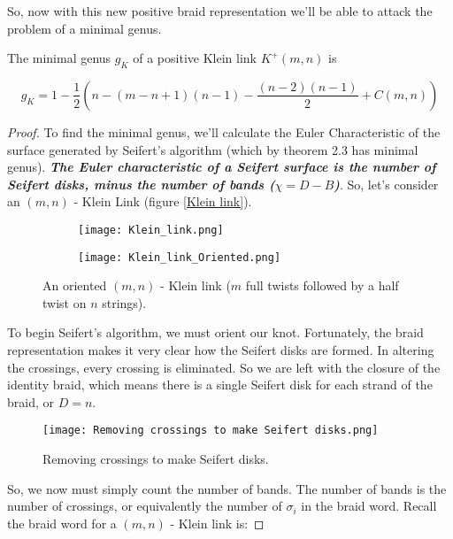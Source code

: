 \documentclass[12pt]{article}
\newenvironment{theorem}[2][Theorem]{\begin{trivlist}
\item[\hskip \labelsep {\bfseries #1}\hskip \labelsep {\bfseries #2.}]}{\end{trivlist}}
\begin{document}
So, now with this new positive braid representation we'll be able to attack the problem of a minimal genus. 


\begin{theorem}{2.4}
The minimal genus $g_K$ of a positive Klein link $K^+(m, n)$ is 

\begin{equation}
g_K =  1 - \frac{1}{2}\left(n - (m - n + 1)(n-1) - \frac{(n-2)(n-1)}{2} + C(m, n)\right)
\end{equation}
\end{theorem}

\begin{proof}
To find the minimal genus, we'll calculate the Euler Characteristic of the surface generated by Seifert's algorithm (which by theorem 2.3 has minimal genus). \textit{\textbf{The Euler characteristic of a Seifert surface is the number of Seifert disks, minus the number of bands ($\chi = D - B$)}}. So, let's consider an $(m, n)$ - Klein Link (figure \ref{Klein link}).


\begin{figure}[H]
\centering
\begin{subfigure}{0.5\textwidth}
  \centering
  \texttt{[image: Klein\_link.png]}
  \label{fig:sub1}
\end{subfigure}%
\begin{subfigure}{.5\textwidth}
  \texttt{[image: Klein\_link\_Oriented.png]}
  \label{fig:sub2}
\end{subfigure}
\caption{\label{Klein link} An oriented $(m, n)$ - Klein link ($m$ full twists followed by a half twist on $n$ strings).}
\label{fig:test}
\end{figure}

To begin Seifert's algorithm, we must orient our knot. Fortunately, the braid representation makes it very clear how the Seifert disks are formed. In altering the crossings, every crossing is eliminated. So we are left with the closure of the identity braid, which means there is a single Seifert disk for each strand of the braid, or $D = n$.

\begin{figure}[H]
\centering
\texttt{[image: Removing crossings to make Seifert disks.png]}
\caption{\label{Crossing Switch} Removing crossings to make Seifert disks.}
\label{fig:test}
\end{figure}

So, we now must simply count the number of bands. The number of bands is the number of crossings, or equivalently the number of $\sigma_i$ in the braid word.  Recall the braid word for a $(m, n)$ - Klein link is:


\end{proof}
\end{document}
